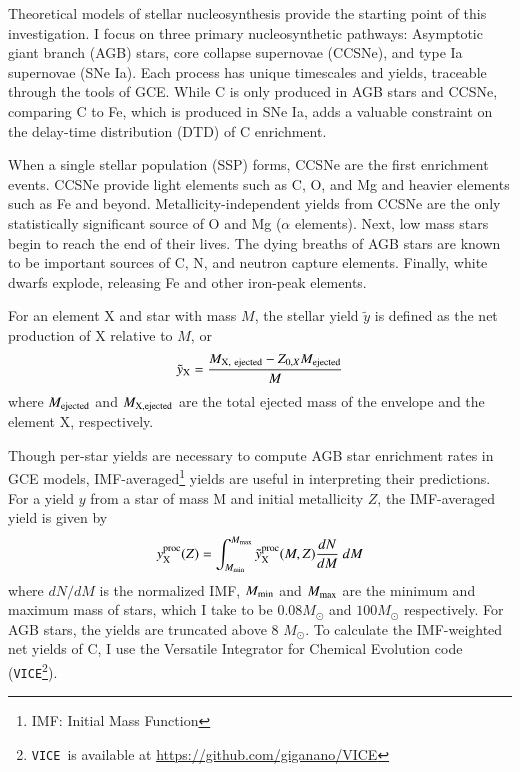 \documentclass[12pt,oneside]{report}
\newcommand{\VICE}{\texttt{VICE}}
\newcommand{\sun}{\ensuremath{\odot}}
\begin{document}
Theoretical models of stellar nucleosynthesis provide the starting point of this investigation. I focus on three primary nucleosynthetic pathways: Asymptotic giant branch (AGB) stars, core collapse supernovae (CCSNe), and type Ia supernovae (SNe Ia). Each process has unique timescales and yields, traceable through the tools of GCE. While C is only produced in AGB stars and CCSNe, comparing C to Fe, which is produced in SNe Ia, adds a valuable constraint on the delay-time distribution (DTD) of C enrichment.

When a single stellar population (SSP) forms, CCSNe are the first enrichment events. CCSNe provide light elements such as C, O, and Mg and heavier elements such as Fe and beyond. Metallicity-independent yields from CCSNe are the only statistically significant source of O and Mg ($\alpha$ elements). Next, low mass stars begin to reach the end of their lives. The dying breaths of AGB stars are known to be important sources of C, N, and neutron capture elements.  Finally, white dwarfs explode, releasing Fe and other iron-peak elements.


For an element X and star with mass $M$, the stellar yield $\tilde{y}$ is defined as the net production of X relative to $M$, or
\begin{equation}
    \tilde{y}_{\rm X} = \frac{M_{\rm X,\ ejected} - Z_{0, X} M_{\rm ejected}}{M}   
\end{equation}
where $M_{\rm ejected}$ and $M_{\rm X, ejected}$  are the total ejected mass of the envelope and the element X, respectively. 

Though per-star yields are necessary to compute AGB star enrichment rates in GCE models, IMF-averaged\footnote{IMF: Initial Mass Function} yields are useful in interpreting their predictions. For a yield $y$ from a star of mass M and initial metallicity $Z$, the IMF-averaged yield is given by 
\begin{equation} \label{eq:imf-yield}
    y_{\rm X}^{\rm proc}(Z) = 
    \int_{M_{\rm min}}^{M_{\rm max}} 
    \tilde{y}_{\rm X}^{\rm proc}(M, Z)
    \frac{dN}{dM}  \ dM
\end{equation}
where ${dN}/{dM}$ is the normalized IMF, $M_{\rm min}$ and $M_{\rm max}$ are the minimum and maximum mass of stars, which I take to be $0.08 M_{\sun}$ and $100 M_{\sun}$ respectively. For AGB stars, the yields are truncated above 8 $M_{\odot}$. 
To calculate the IMF-weighted net yields of C, I use the Versatile Integrator for Chemical Evolution code (\VICE\footnote{\VICE~is available at \url{https://github.com/giganano/VICE}}).
\end{document}

